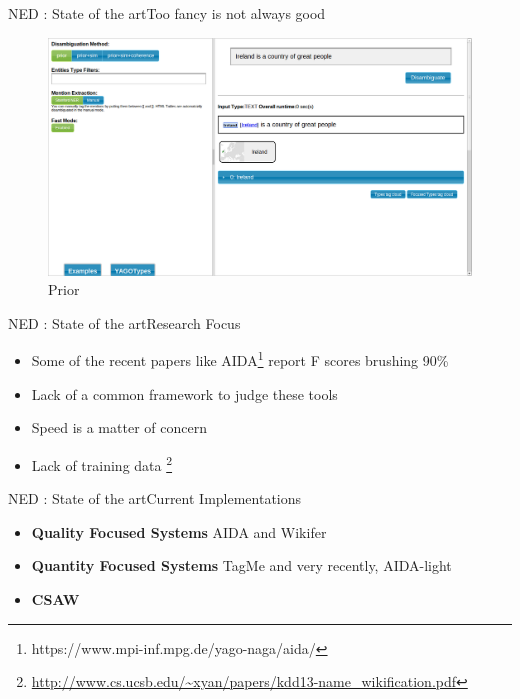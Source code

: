 \begin{frame}{NED : State of the art}{Too fancy is not always good}
\begin{figure}[h]
 \centering
 \includegraphics[bb=0 0 1366 768,scale=0.23]{./prior3.png}
 \caption{Prior}
\end{figure}
\end{frame}



\begin{frame}{NED : State of the art}{Research Focus}
 \begin{itemize}
  \item Some of the recent papers like AIDA\footnote{https://www.mpi-inf.mpg.de/yago-naga/aida/} report F scores brushing 90\% \medskip
  \item Lack of a common framework to judge these tools   \medskip
  \item Speed is a matter of concern \medskip
  \item Lack of training data \footnote{\url{http://www.cs.ucsb.edu/~xyan/papers/kdd13-name_wikification.pdf}} \medskip
 \end{itemize}
\end{frame}

\begin{frame}{NED : State of the art}{Current Implementations}
 \begin{itemize}
  \item \textbf{Quality Focused Systems} AIDA and Wikifer \medskip
  \item \textbf{Quantity Focused Systems} TagMe and very recently, AIDA-light \medskip
  \item \textbf{CSAW}
 \end{itemize}

\end{frame}

